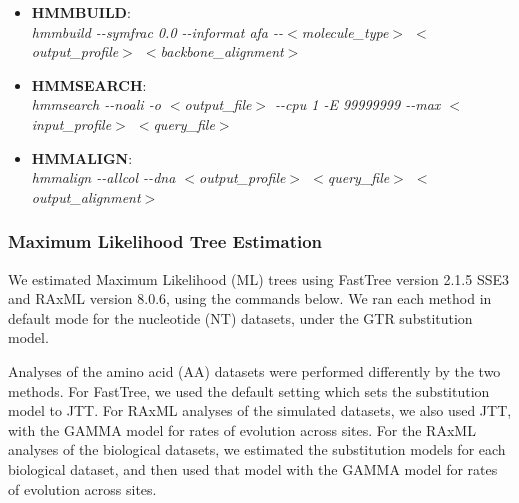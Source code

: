 \begin{itemize}
\item \textbf{HMMBUILD}:\\\emph{hmmbuild -{}-symfrac 0.0 -{}-informat afa -{}-$<$molecule\_type$>$ $<$output\_profile$>$ $<$backbone\_alignment$>$}
\item \textbf{HMMSEARCH}:\\\emph{hmmsearch -{}-noali -o $<$output\_file$>$ -{}-cpu 1 -E 99999999 -{}-max $<$input\_profile$>$ $<$query\_file$>$}
\item \textbf{HMMALIGN}:\\\emph{hmmalign -{}-allcol -{}-dna $<$output\_profile$>$ $<$query\_file$>$ $<$output\_alignment$>$}
\end{itemize}

\subsubsection{Maximum Likelihood Tree Estimation}

We estimated Maximum Likelihood (ML) trees using FastTree \cite{Price2010} version 2.1.5 SSE3 and 
RAxML version 8.0.6, using the commands below.  
We ran each method in default mode for the
nucleotide (NT) datasets,  under the  GTR substitution model.


Analyses of the amino acid (AA) datasets 
were performed differently by the two methods.
For FastTree, we used the default setting which sets the substitution
model to JTT. 
For RAxML analyses of the simulated datasets, we also used
JTT, with the GAMMA model for rates of evolution across sites.
For the RAxML analyses of the biological datasets, we
estimated the 
substitution models for each biological  dataset, and then used
that model with the GAMMA model for rates of evolution across sites.

%


